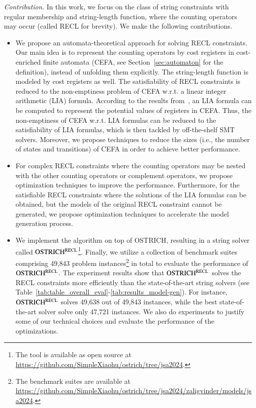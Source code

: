 \medskip
\noindent 
\emph{Contribution.} In this work, we focus on the class of string constraints with regular membership and string-length function, where the counting operators may occur (called RECL for brevity). We make the following contributions.
\begin{itemize}
  \item We propose an automata-theoretical approach for solving RECL constraints.
 Our main idea is to represent the counting operators by cost registers in cost-enriched finite automata (CEFA, see Section~\ref{sec:automaton} for the definition), instead of unfolding them explicitly. The string-length function is modeled by cost registers as well. The satisfiability of RECL constraints is reduced to the non-emptiness problem of CEFA w.r.t. a linear integer arithmetic (LIA) formula. According to the results from~\cite{atva2020}, an LIA formula can be computed to represent the potential values of registers in CEFA.
Thus, the non-emptiness of CEFA w.r.t. LIA formulas can be reduced to the satisfiability of LIA formulas, which is then tackled by off-the-shelf SMT solvers. Moreover, we propose techniques to reduce the sizes (i.e., the number of states and transitions) of CEFA in order to achieve better performance.
%
  \item For complex RECL constraints where the counting operators may be nested with the other counting operators or complement operators, we propose optimization techniques to improve the performance. Furthermore, for the satisfiable RECL constraints where the solutions of the LIA formulas can be obtained, but the models of the original RECL constraint cannot be generated,  we propose optimization techniques to accelerate the model generation process. 
%
\item We implement the algorithm on top of OSTRICH, resulting in a string solver called $\rm OSTRICH^{RECL}$\footnote{The tool is available as open source at \url{https://github.com/SimpleXiaohu/ostrich/tree/jsa2024}.}. Finally, we utilize a collection of benchmark suites comprising 49,843 problem instances\footnote{The benchmark suites are available at \url{https://github.com/SimpleXiaohu/ostrich/tree/jsa2024/zaligvinder/models/jsa2024}.} in total to evaluate the performance of $\rm OSTRICH^{RECL}$. The experiment results show that $\rm OSTRICH^{RECL}$ solves the RECL constraints more efficiently than the state-of-the-art string solvers (see Table~\ref{tab:table_overall_eval}-\ref{tab:results_model-gen}). For instance, $\rm OSTRICH^{RECL}$ solves 49,638 out of 49,843 instances, while the best state-of-the-art solver solve only 47,721 instances. We also do experiments to justify some of our technical choices and evaluate the performance of the optimizations. 

\end{itemize}
